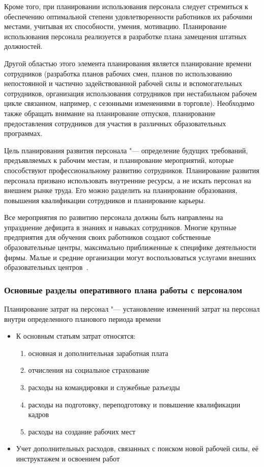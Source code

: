 \documentclass{../industrial-development}
\begin{document}
Кроме того, при планировании использования персонала следует стремиться к обеспечению оптимальной степени удовлетворенности работников их рабочими местами, учитывая их способности, умения, мотивацию. Планирование использования персонала реализуется в разработке плана замещения штатных должностей.

Другой областью этого элемента планирования является планирование времени сотрудников (разработка планов рабочих смен, планов по использованию непостоянной и частично задействованной рабочей силы и вспомогательных сотрудников, организация использования сотрудников при нестабильном рабочем цикле связанном, например, с сезонными изменениями в торговле). Необходимо также обращать внимание на планирование отпусков, планирование предоставления сотрудников для участия в различных образовательных программах.

\alert{Цель планирования развития персонала} "---  определение будущих требований, предъявляемых к рабочим местам, и планирование мероприятий, которые способствуют профессиональному развитию сотрудников. Планирование развития персонала призвано использовать внутренние ресурсы, а не искать персонал на внешнем рынке труда. Его можно разделить на планирование образования, повышения квалификации сотрудников и планирование карьеры.

Все мероприятия по развитию персонала должны быть направлены на упразднение дефицита в знаниях и навыках сотрудников. Многие крупные предприятия для обучения своих работников создают собственные образовательные центры, максимально приближенные к специфике деятельности фирмы. Малые и средние организации могут воспользоваться услугами внешних образовательных центров~\cite{Durakova}.

\begin{frame} \frametitle{Основные разделы оперативного плана работы с персоналом}
\alert{Планирование затрат на персонал} "--- установление изменений затрат на персонал внутри определенного планового периода времени
  \begin{itemize}
 \item К основным статьям затрат относятся: 
  \begin{enumerate}
\item основная и дополнительная заработная плата
\item отчисления на социальное страхование
\item расходы на командировки и служебные разъезды
\item расходы на подготовку, переподготовку и повышение квалификации кадров
\item расходы на создание рабочих мест
	  \end{enumerate}
\item Учет дополнительных расходов, связанных с поиском новой рабочей силы, её инструктажем и освоением работ
	  \end{itemize}
\end{frame}
\end{document}
